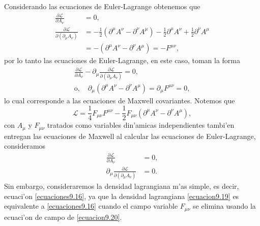 Considerando las ecuaciones de Euler-Lagrange obtenemos que
\begin{equation}
\begin{aligned}
\frac{\partial\mathcal{L}}{\partial A_\nu}&=0, \\
\frac{\partial\mathcal{L}}{\partial(\partial_\mu A_\nu)}&=-\frac{1}{2}(\partial^\mu A^\nu-\partial^\nu A^\mu)-\frac{1}{2}\partial^\mu A^\nu+\frac{1}{2}\partial^\nu A^\mu \\
&=-(\partial^\mu A^\nu-\partial^\nu A^\mu)=-F^{\mu\nu},
\end{aligned}
\end{equation}
por lo tanto las ecuaciones de Euler-Lagrange, en este caso, toman la forma
\begin{equation}
\begin{aligned}
\frac{\partial\mathcal{L}}{\partial A_\nu}-\partial_\mu \frac{\partial\mathcal{L}}{\partial(\partial_\mu A_\nu)}=0, \\
\text{o},\quad \partial_\mu(\partial^\mu A^\nu-\partial^\nu A^\mu)=\partial_\mu F^{\mu\nu}=0,
\end{aligned}
\end{equation}
lo cual corresponde a las ecuaciones de Maxwell covariantes. Notemos que
\begin{equation}\label{ecuacion9.19}
\mathcal{L}=\frac{1}{4}F_{\mu\nu}F^{\mu\nu}-\frac{1}{2}F_{\mu\nu}(\partial^\mu A^\nu-\partial^\nu A^\mu),
\end{equation}
con $A_\mu$ y $F_{\mu\nu}$ tratados como variables din'amicas independientes tambi'en entregan las ecuaciones de Maxwell al calcular las ecuaciones de Euler-Lagrange, consideramos
\begin{equation}\label{ecuacion9.20}
\begin{aligned}
\frac{\partial\mathcal{L}}{\partial A_\nu}&=0, \\
\partial_\mu \frac{\partial\mathcal{L}}{\partial(\partial_\mu A_\nu)}&=0.
\end{aligned}
\end{equation}
Sin embargo, consideraremos la densidad lagrangiana m'as simple, es decir, ecuaci'on \eqref{ecuaciones9.16}, ya que la densidad lagrangiana \eqref{ecuacion9.19} es equivalente a \eqref{ecuaciones9.16} cuando el
campo variable $F_{\mu\nu}$  se elimina usando la ecuaci'on de campo de \eqref{ecuacion9.20}.
